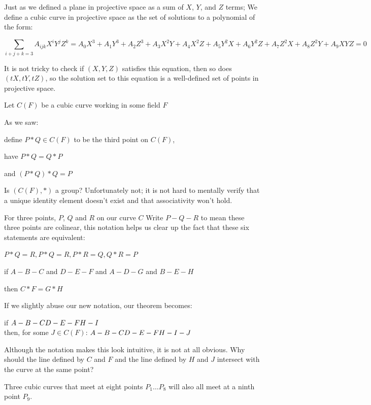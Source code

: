 \documentclass{article}
\begin{document}
Just as we defined a plane in projective space as a sum of $X$, $Y$, and $Z$ terms; We define a cubic curve in projective space as the set of solutions to a polynomial of the form:

\[\sum_{i + j + k = 3} A_{ijk}X^i Y^j Z^k = A_0 X^3 + A_1 Y^3 + A_2 Z^3 + A_3 X^2Y + A_4 X^2Z + A_5 Y^2X + A_6 Y^2Z + A_7 Z^2X + A_8 Z^2Y + A_9 XYZ = 0\]

It is not tricky to check if $(X, Y, Z)$ satisfies this equation, then so does $(tX, tY, tZ)$, so the solution set to this equation is a well-defined set of points in projective space.

Let $C(F)$ be a cubic curve working in some field $F$

As we saw:

define $P * Q \in C(F)$ to be the third point on $C(F)$,

have $P * Q = Q * P$

and $(P * Q) * Q = P$

Is $(C(F), *)$ a group? Unfortunately not; it is not hard to mentally verify that a unique identity element doesn't exist and that associativity won't hold.

For three points, $P$, $Q$ and $R$ on our curve $C$ Write $P - Q - R$ to mean these three points are colinear, this notation helps us clear up the fact that these six statements are equivalent:

$P * Q = R, P * Q = R, P * R = Q,  Q * R = P$

if $A - B - C$ and $D - E - F$ and $A - D - G$ and $B - E - H$

then $C * F = G * H$

If we slightly abuse our new notation, our theorem becomes:

if
$
\\
A - B - C \\
D - E - F \\
H - I
$\\
then, for some $J \in C(F)$:
$
\\
A - B - C \\
D - E - F \\
H - I - J
$

Although the notation makes this look intuitive, it is not at all obvious. 
Why should the line defined by $C$ and $F$ and the line defined by $H$ and $J$ intersect with the curve at the same point? 

Three cubic curves that meet at eight points $P_1 \dots P_8$ will also all meet at a ninth point $P_9$.
\end{document}
